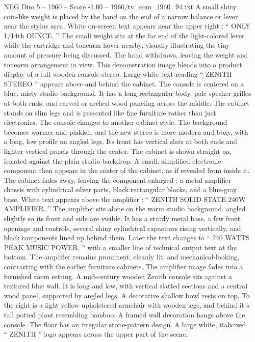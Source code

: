 \begin{textsample}{NEG Dim 5 – 1960 – Score -1.00 – 1960/tv\_com\_1960\_94.txt}
A small shiny coin-like weight is placed by the hand on the end of a narrow balance or lever near the stylus area.
White on-screen text appears near the upper right : “ ONLY 1/14th OUNCE. ” The small weight sits at the far end of the light-colored lever while the cartridge and tonearm hover nearby, visually illustrating the tiny amount of pressure being discussed.
The hand withdraws, leaving the weight and tonearm arrangement in view.
This demonstration image blends into a product display of a full wooden console stereo.
Large white text reading “ ZENITH STEREO ” appears above and behind the cabinet.
The console is centered on a blue, misty studio background.
It has a long rectangular body, pale speaker grilles at both ends, and carved or arched wood paneling across the middle.
The cabinet stands on slim legs and is presented like fine furniture rather than just electronics.
The console changes to another cabinet style.
The background becomes warmer and pinkish, and the new stereo is more modern and boxy, with a long, low profile on angled legs.
Its front has vertical slats at both ends and lighter vertical panels through the center.
The cabinet is shown straight on, isolated against the plain studio backdrop.
A small, simplified electronic component then appears in the center of the cabinet, as if revealed from inside it.
The cabinet fades away, leaving the component enlarged : a metal amplifier chassis with cylindrical silver parts, black rectangular blocks, and a blue-gray base.
White text appears above the amplifier : “ ZENITH SOLID STATE 240W AMPLIFIER. ” The amplifier sits alone on the warm studio background, angled slightly so its front and side are visible.
It has a sturdy metal base, a few front openings and controls, several shiny cylindrical capacitors rising vertically, and black components lined up behind them.
Later the text changes to “ 240 WATTS PEAK MUSIC POWER, ” with a smaller line of technical output text at the bottom.
The amplifier remains prominent, cleanly lit, and mechanical-looking, contrasting with the earlier furniture cabinets.
The amplifier image fades into a furnished room setting.
A mid-century wooden Zenith console sits against a textured blue wall.
It is long and low, with vertical slatted sections and a central wood panel, supported by angled legs.
A decorative shallow bowl rests on top.
To the right is a light yellow upholstered armchair with wooden legs, and behind it a tall potted plant resembling bamboo.
A framed wall decoration hangs above the console.
The floor has an irregular stone-pattern design.
A large white, italicized “ ZENITH ” logo appears across the upper part of the scene.

\end{textsample}

